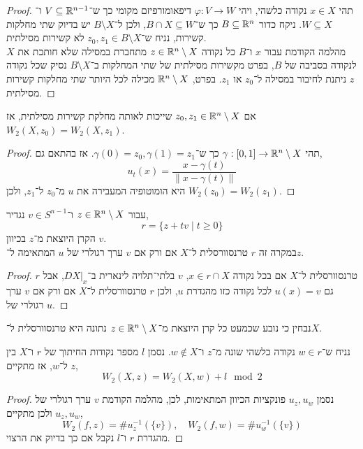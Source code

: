 \begin{proof}
	תהי $x \in X$ נקודה כלשהי, ויהי $\varphi : V \to W$ דיפאומורפיזם מקומי כך ש־$V \subseteq \mathbb{R}^{n - 1}$ ו־$W \subseteq X$.
	ניקח כדור $B \subseteq \mathbb{R}^n$ כך ש־$B \cap X \subseteq W$, ולכן ל־$B \setminus X$ יש בדיוק שתי מחלקות קשירות, נניח ש־$z_0, z_1 \in B \setminus X$ לא קשירות מסילתית. \\
	מהלמה הקודמת עבור $x$ ו־$B$ כל נקודה $z \in \mathbb{R}^n \setminus X$ מתחברת במסילה שלא חותכת את $X$ לנקודה בסביבה של $B$, בפרט מקשירות מסילתית של שתי המחלקות ב־$B \setminus X$ נסיק שכל נקודה $z$ ניתנת לחיבור במסילה ל־$z_0$ או $z_1$.
	בפרט, $\mathbb{R}^n \setminus X$ מכילה לכל היותר שתי מחלקות קשירות מסילתית.
\end{proof}
\begin{lemma}\label{same_connected_component_implies_same_winding_lemma}
	אם $z_0, z_1 \in \mathbb{R}^n \setminus X$ שייכות לאותה מחלקת קשירות מסילתית, אז $W_2(X, z_0) = W_2(X, z_1)$.
\end{lemma}
\begin{proof}
	תהי $\gamma : [0, 1] \to \mathbb{R}^n \setminus X$ כך ש־$\gamma(0) = z_0, \gamma(1) = z_1$.
	אז בהתאם גם,
	\[
		u_t(x)
		= \frac{x - \gamma(t)}{\lVert x - \gamma(t) \rVert}
	\]
	היא הומוטופיה המעבירה את $u$ מ־$z_0$ ל־$z_1$, ולכן $W_2(z_0) = W_2(z_1)$.
\end{proof}
\begin{lemma}
	עבור $z \in \mathbb{R}^n \setminus X$ ו־$v \in S^{n - 1}$ נגדיר,
	\[
		r = \{ z + t v \mid t \ge 0 \}
	\]
	הקרן היוצאת מ־$z$ בכיוון $v$. \\
	במקרה זה $r$ טרנסוורסלית ל־$X$ אם ורק אם $v$ ערך רגולרי של $u$ המתאימה ל־$z$.
\end{lemma}
\begin{proof}
	$r$ טרנסוורסלית ל־$X$ אם בכל נקודה $x \in r \cap X$, $v$ בלתי־תלויה לינארית ב־$D X |_x$, אבל גם $u(x) = v$ לכל נקודה כזו מהגדרת $u$, ולכן $r$ טרנסוורסלית ל־$X$ אם ורק אם $v$ ערך רגולרי של $u$.
\end{proof}
נבחין כי נובע שכמעט כל קרן היוצאת מ־$z \in \mathbb{R}^n \setminus X$ נתונה היא טרנסוורסלית ל־$X$.
\begin{lemma}
	נניח ש־$w \in r$ נקודה כלשהי שונה מ־$z$ ו־$w \notin X$.
	נסמן $l$ מספר נקודות החיתוך של $r$ ו־$X$ בין $z$ ל־$w$,
	אז מתקיים,
	\[
		W_2(X, z)
		= W_2(X, w) + l \mod 2
	\]
\end{lemma}
\begin{proof}
	נסמן $u_z, u_w$ פונקציות הכיוון המתאימות, לכן,
	מהלמה הקודמת $v$ ערך רגולרי של $u_z, u_w$ ולכן מתקיים,
	\[
		W_2(f, z) = \# u_z^{-1}(\{ v \}),
		\quad
		W_2(f, w) = \# u_w^{-1}(\{ v \})
	\]
	מהגדרת $r$ ו־$l$ נקבל אם כך בדיוק את הרצוי.
\end{proof}
